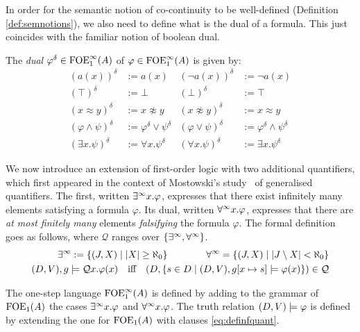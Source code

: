 In order for the semantic notion of co-continuity to be well-defined (Definition \ref{def:semnotions}), we also need to define what is the dual of a formula. This just coincides with the familiar notion of boolean dual.
\begin{definition}\label{def:concreteduals} 
The \emph{dual} $\varphi^{\delta} \in {\ensuremath{\mathrm{FOE}^{\infty}_1}}(A)$ of $\varphi\in {\ensuremath{\mathrm{FOE}^{\infty}_1}}(A)$ is given by:
\begin{align*}
 (a(x))^{\delta} & :=  a(x) 
 & (\lnot a(x))^{\delta} & :=  \lnot a(x) 
\\ (\top)^{\delta} & :=  \bot 
  & (\bot)^{\delta} & :=  \top 
\\  (x \approx y)^{\delta} & :=  x \not\approx y 
  & (x \not\approx y)^{\delta}& :=  x \approx y 
\\ (\varphi \wedge \psi)^{\delta} &:=  \varphi^{\delta} \vee \psi^{\delta} 
  &(\varphi \vee \psi)^{\delta}& :=  \varphi^{\delta} \wedge \psi^{\delta}
\\ (\exists x.\psi)^{\delta} &:=  \forall x.\psi^{\delta} 
  &(\forall x.\psi)^{\delta} &:=  \exists x.\psi^{\delta} 
\end{align*}
\end{definition}

We now introduce an extension of first-order logic with two additional quantifiers, which first appeared in the context of Mostowski's study~\cite{Mostowski1957} of generalised quantifiers. The first, written $\exists^\infty x. \varphi$, expresses that there exist infinitely many elements satisfying a formula $\varphi$. Its dual, written $\forall^\infty x. \varphi$, expresses that there are \emph{at most finitely many} elements \emph{falsifying} the formula $\varphi$. The formal definition goes as follows, where $\mathcal Q$ ranges over $\{\exists^\infty, \forall^\infty\}$.
\begin{equation}\label{eq:definfquant}
\begin{aligned}
\qu := \{(J,X) \mid |X| \geq \aleph_0\} \qquad \qquad \dqu =\{(J,X) \mid |J\setminus X| < \aleph_0\} \\
(D,V),\ass \models {\mathcal Q}x. \phi(x) \quad\text{iff}\quad (D , \{s\in D \mid (D, \val),\ass[x\mapsto s] \models \phi(x) \}) \in {\mathcal Q}
\end{aligned}
\end{equation}

\begin{definition}
The one-step language $\mathrm{FOE}^{\infty}_1(A)$ is defined by adding to the grammar of $\mathrm{FOE}_1(A)$ the cases $\exists^\infty x. \varphi$ and $\forall^\infty x. \varphi$. The truth relation $(D, V) \models \varphi$ is defined by extending the one for $\mathrm{FOE}_1(A)$ with clauses \eqref{eq:definfquant}.
\end{definition}

